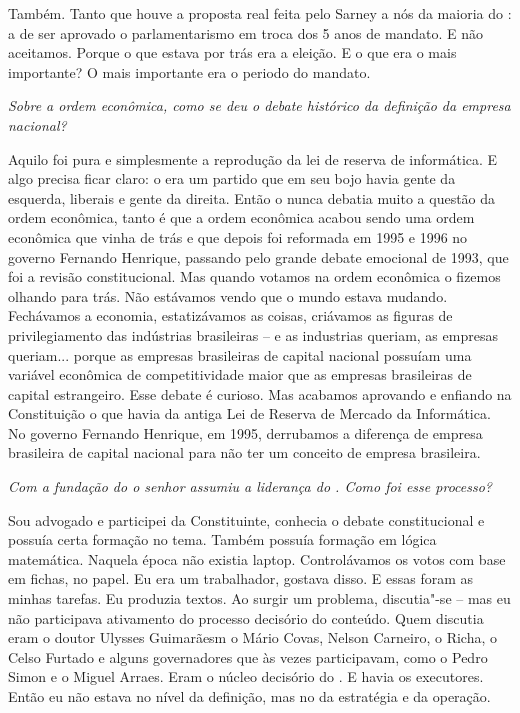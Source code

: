 Também. Tanto que houve a proposta real feita pelo
Sarney a nós da maioria do : a de ser aprovado o parlamentarismo em
troca dos 5 anos de mandato. E não aceitamos. Porque o que estava por
trás era a eleição. E o que era o mais importante? O mais importante era
o periodo do mandato.

\medskip

\noindent\emph{Sobre a ordem econômica, como se deu o debate histórico da definição da
empresa nacional?}

Aquilo foi pura e simplesmente a reprodução da lei de
reserva de informática. E algo precisa ficar claro: o  era um
partido que em seu bojo havia gente da esquerda, liberais e gente da
direita. Então o  nunca debatia muito a questão da ordem econômica,
tanto é que a ordem econômica acabou sendo uma ordem econômica que vinha
de trás e que depois foi reformada em 1995 e 1996 no governo Fernando
Henrique, passando pelo grande debate emocional de 1993, que foi a
revisão constitucional. Mas quando votamos na ordem econômica o fizemos
olhando para trás. Não estávamos vendo que o mundo estava mudando.
Fechávamos a economia, estatizávamos as coisas, criávamos as figuras de
privilegiamento das indústrias brasileiras -- e as industrias queriam,
as empresas queriam... porque as empresas brasileiras de capital
nacional possuíam uma variável econômica de competitividade maior que as
empresas brasileiras de capital estrangeiro. Esse debate é curioso. Mas
acabamos aprovando e enfiando na Constituição o que havia da antiga Lei
de Reserva de Mercado da Informática. No governo Fernando Henrique, em
1995, derrubamos a diferença de empresa brasileira de capital nacional
para não ter um conceito de empresa brasileira.

\medskip

\noindent\emph{Com a fundação do  o senhor assumiu a liderança do . Como foi
esse processo?}

Sou advogado e participei da Constituinte, conhecia o
debate constitucional e possuía certa formação no tema. Também possuía
formação em lógica matemática. Naquela época não existia laptop.
Controlávamos os votos com base em fichas, no papel. Eu era um
trabalhador, gostava disso. E essas foram as minhas tarefas. Eu produzia
textos. Ao surgir um problema, discutia"-se -- mas eu não participava
ativamento do processo decisório do conteúdo. Quem discutia eram o
doutor Ulysses Guimarãesm o Mário Covas, Nelson Carneiro, o Richa, o
Celso Furtado e alguns governadores que às vezes participavam, como o
Pedro Simon e o Miguel Arraes. Eram o núcleo decisório do . E havia
os executores. Então eu não estava no nível da definição, mas no da
estratégia e da operação.

